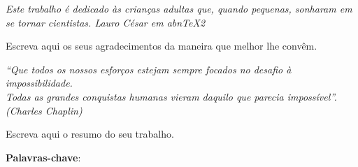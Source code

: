 \documentclass[
	12pt,				%
	openright,			%
	oneside,			%
	a4paper,			%
	english,			%
	brazil				%
	]{abntex2}
\theoremstyle{definition}
\begin{document}

\frenchspacing 

\pretextual{}

\imprimircapa{}

\imprimirfolhaderosto{}

%    
\newpage

\begin{folhadeaprovacao}
\imprimirfolhadeaprovacao{}
\end{folhadeaprovacao}

\begin{dedicatoria}
    \vspace*{\fill}
    \flushright{}
    \textit{Este trabalho é dedicado às crianças adultas que,
	quando pequenas, sonharam em se tornar cientistas.
	\- Lauro César em abnTeX2}
\end{dedicatoria}

\begin{agradecimentos}
Escreva aqui os seus agradecimentos da maneira que melhor lhe convêm.
\end{agradecimentos}

\begin{epigrafe}
    \vspace*{\fill}
	\begin{flushright}
		\textit{``Que todos os nossos esforços estejam sempre focados no desafio à impossibilidade.\\ Todas as grandes conquistas humanas vieram daquilo que parecia impossível''.\\
		(Charles Chaplin)}
	\end{flushright}
\end{epigrafe}

\setlength{\absparsep}{18pt}
\begin{resumo}
Escreva aqui o resumo do seu trabalho.

\textbf{Palavras-chave}: \imprimirpalavraschave{}
\end{resumo}
\end{document}
